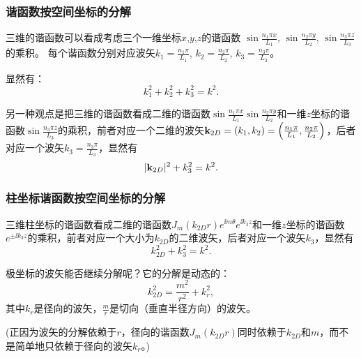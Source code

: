 \documentclass[CJK]{beamer}
\begin{document}
\begin{frame}
\frametitle{谐函数按空间坐标的分解}

三维的谐函数可以看成考虑三个一维坐标$x$,$y$,$z$的谐函数 $\sin{\frac{n_1\pi x}{L_1}}$, $\sin{\frac{n_2\pi y}{L_2}}$, $\sin{\frac{n_3\pi z}{L_3}}$的乘积。
每个谐函数分别对应波矢$k_1 = \frac{n_1\pi}{L_1}$, $k_2=\frac{n_2\pi}{L_2}$, $k_3=\frac{n_3\pi}{L_3}$。

显然有：
$$k_1^2+k_2^2+k_3^2 = k^2.$$

另一种观点是把三维的谐函数看成二维的谐函数$\sin{\frac{n_1\pi x}{L_1}}\sin{\frac{n_2\pi y}{L_2}}$和一维$z$坐标的谐函数$\sin{\frac{n_3\pi z}{L_3}}$的乘积，前者对应一个二维的波矢${\mathbf{k}}_{2D} = (k_1,k_2) = \left(\frac{n_1\pi }{L_1}, \frac{n_2\pi }{L_2}\right)$，后者对应一个波矢$k_3 = \frac{n_3\pi }{L_3}$，显然有
$$ |{\mathbf{k}}_{2D}|^2 + k_3^2 = k^2 .$$

\end{frame}




\begin{frame}
\frametitle{柱坐标谐函数按空间坐标的分解}

三维柱坐标的谐函数看成二维的谐函数$J_m(k_{2D}r)e^{\ii m\theta}e^{\ii k_3 z}$和一维$z$坐标的谐函数$e^{\pm \ii k_3 z}$的乘积，前者对应一个大小为$k_{2D}$的二维波矢，后者对应一个波矢$k_3$，显然有
$$ k_{2D}^2 + k_3^2 = k^2 .$$

\skiplines

极坐标的波矢能否继续分解呢？它的分解是动态的：
$$k_{2D}^2 = \frac{m^2}{r^2}+k_r^2,$$
其中$k_r$是径向的波矢，$\frac{m}{r}$是切向（垂直半径方向）的波矢。

{\small \darkgreen (正因为波矢的分解依赖于$r$，径向的谐函数$J_m(k_{2D}r)$同时依赖于$k_{2D}$和$m$，而不是简单地只依赖于径向的波矢$k_r$。)}

\end{frame}


\end{document}
